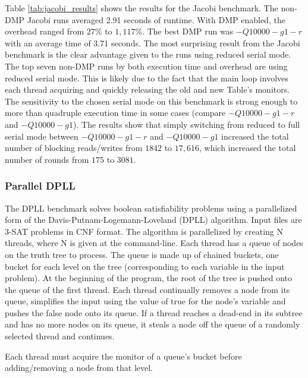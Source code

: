 Table \ref{tab:jacobi_results} shows the results for the Jacobi
benchmark.  The non-DMP Jacobi runs averaged 2.91 seconds of runtime.
With DMP enabled, the overhead ranged from $27\%$ to $1,117\%$.  The
best DMP run was $-Q10000 -g1 -r$ with an average time of 3.71
seconds.  The most surprising result from the Jacobi benchmark is the
clear advantage given to the runs using reduced serial mode.  The top
seven non-DMP runs by both execution time and overhead are using
reduced serial mode.  This is likely due to the fact that the main
loop involves each thread acquiring and quickly releasing the old and
new Table's monitors.  The sensitivity to the chosen serial mode on
this benchmark is strong enough to more than quadruple execution time
in some cases (compare $-Q10000 -g1 -r$ and $-Q10000 -g1$).  The
results show that simply switching from reduced to full serial mode
between $-Q10000 -g1 -r$ and $-Q10000 -g1$ increased the total number
of blocking reads/writes from $1842$ to $17,616$, which increased the
total number of rounds from $175$ to $3081$.

\subsubsection{Parallel DPLL}

The DPLL benchmark solves boolean satisfiability problems using a
parallelized form of the Davis-Putnam-Logemann-Loveland (DPLL)
algorithm.  Input files are 3-SAT problems in CNF format.  The
algorithm is parallelized by creating N threads, where N is given at
the command-line.  Each thread has a queue of nodes on the truth tree
to process.  The queue is made up of chained buckets, one bucket for
each level on the tree (corresponding to each variable in the input
problem).  At the beginning of the program, the root of the tree is
pushed onto the queue of the first thread.  Each thread continually
removes a node from its queue, simplifies the input using the value of
true for the node's variable and pushes the false node onto its queue.
If a thread reaches a dead-end in its subtree and has no more nodes on
its queue, it steals a node off the queue of a randomly selected
thread and continues.

Each thread must acquire the monitor of a queue's bucket before
adding/removing a node from that level.

